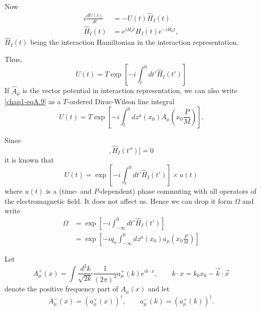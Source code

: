 Now
\begin{align*}
  i \frac{dU(t)}{dt} & = -U (t) \hat{H}_I(t)\\
  \hat{H}_I (t) & = e^{iH_0t} H_I (t) e^{-iH_0t}, \label{chap1-eqA.8}\tag{A.8}
\end{align*}
$\hat{H}_I(t)$ being the interaction Hamiltonian in the interaction representation.

Thus,
\begin{equation*}
U(t)= T\exp \left[-i \int^0_t dt' \hat{H}_I (t') \right]\label{chap1-eqA.9}\tag{A.9}
\end{equation*}
If $\hat{A}_\mu$ is the vector potential in interaction representation, we can also write \eqref{chap1-eqA.9} as a $T$-ordered Dirac-Wilson line integral
\begin{equation*}
U(t) = T \exp \left[-i \int^0_t dz^\mu (x_0) A_\mu  \left( x_0 \frac{P}{M}\right)\right]. \label{chap1-eqA.10}\tag{A.10}
\end{equation*}

Since
\begin{equation*}
  [[\hat{H}_I (t), \hat{H}_I(t')], \hat{H}_I (t'')]=0 \label{chap1-eqA.11}\tag{A.11}
\end{equation*}
it is known that \cite{key14}
\begin{equation*}
U(t) = \exp \left[ -i \int^0_t dt' \hat{H}_I (t')\right] \times u(t) \label{chap1-eqA.12}\tag{A.12}
\end{equation*}
where $u(t)$ is a (time- and $P$-dependent) phase commuting with all operators of the electromagnetic field. It does not affect us. Hence we can drop it form $\Omega$ and write
\begin{align*}
  \Omega & = \exp \left[-i \int^0_{-\infty} dt' \hat{H}_I (t') \right] \label{chap1-eqA.13}\tag{A.13}\\
  & = \exp \left[ -iq_n \int^0_{-\infty} dz^\mu (x_0) a_\mu \left( x_0 \frac{P}{M}\right)\right] \label{chap1-eqA.14}\tag{A.14}
\end{align*}

Let
\begin{equation*}
  A_\mu^+ (x) = \int \frac{d^3k}{\sqrt{2k}} \frac{1}{(2\pi)^3}a_\mu^+ (k)e^{ik\cdot x}, \qquad k \cdot x = k_0 x_0- \vec{k} \cdot \vec{x} \label{chap1-eqA.15}\tag{A.15}
\end{equation*}
denote the positive frequency part of $A_\mu(x)$ and let
\begin{equation*}
A_\mu^- (x) = (a_\mu^+ (x))^\dagger, \qquad a_\mu^- (k) = (a_\mu^+ (k))^\dagger. \label{chap1-eqA.16}\tag{A.16}
\end{equation*}

